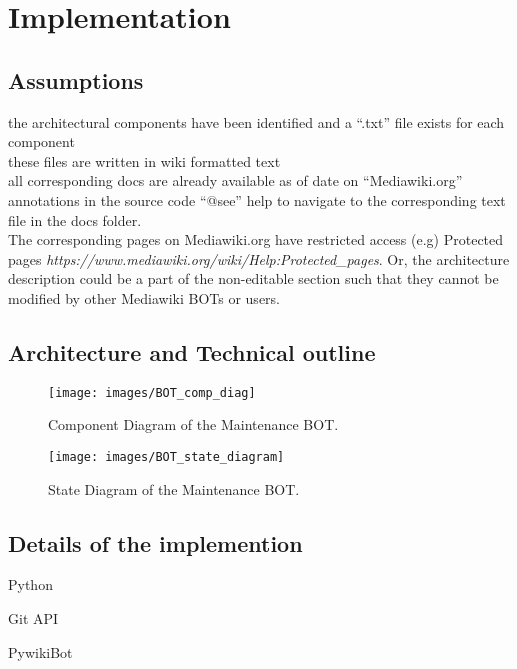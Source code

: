 \chapter{Implementation}\label{chapter:Implementation}

\section{Assumptions}
\indent the architectural components have been identified and a \enquote{.txt} file exists for each component
\\\indent these files are written in wiki formatted text
\\\indent all corresponding docs are already available as of date on  \enquote{Mediawiki.org}
\\\indent annotations in the source code \enquote{@see} help to navigate to the corresponding text file in the docs folder.
\\\indent The corresponding pages on Mediawiki.org have restricted access (e.g) Protected pages \emph{https://www.mediawiki.org/wiki/Help:Protected\_pages}. Or, the architecture description could be a part of the non-editable section such that they cannot be modified by other Mediawiki BOTs or users.
\section{Architecture and Technical outline}

\begin{figure}[H]
  \centering
  \texttt{[image: images/BOT\_comp\_diag]}
  \caption[Component Diagram of the Maintenance BOT]{Component Diagram of the Maintenance BOT.}\label{fig:BOT_comp_diag}
\end{figure}


\begin{figure}[H]
  \centering
  \texttt{[image: images/BOT\_state\_diagram]}
  \caption[State Diagram of the Maintenance BOT]{State Diagram of the Maintenance BOT.}\label{fig:BOT_comp_diag}
\end{figure}

\section{Details of the implemention}

Python

Git API 

PywikiBot

